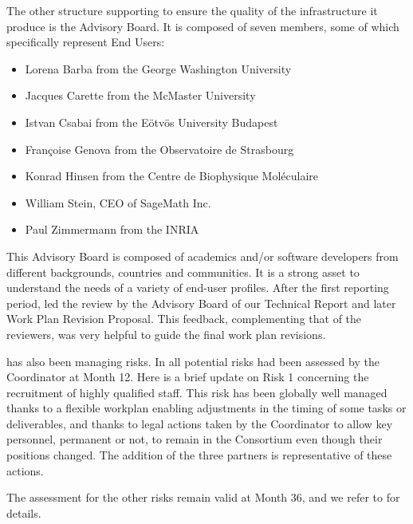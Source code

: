 

The other structure supporting \ODK to ensure the quality of the
infrastructure it produce is the Advisory Board. It is composed of
seven members, some of which specifically represent End Users:

\begin{itemize}
\item{Lorena Barba from the George Washington University}
\item{Jacques Carette from the McMaster University}
\item{Istvan Csabai from the Eötvös University Budapest}
\item{Françoise Genova from the Observatoire de Strasbourg}
\item{Konrad Hinsen from the Centre de Biophysique Moléculaire}
\item{William Stein, CEO of SageMath Inc.}
\item{Paul Zimmermann from the INRIA}
\end{itemize}

This Advisory Board is composed of academics and/or software
developers from different backgrounds, countries and communities. It
is a strong asset to understand the needs of a variety of end-user
profiles. After the first reporting period,  led the review
by the Advisory Board of our Technical Report and later Work Plan
Revision Proposal. This feedback, complementing that of the reviewers,
was very helpful to guide the final work plan revisions.

 has also been managing risks. In 
all potential risks had been assessed by the Coordinator at Month 12.
Here is a brief update on Risk 1 concerning the recruitment of highly
qualified staff. This risk has been globally well managed thanks to a
flexible workplan enabling adjustments in the timing of some tasks or
deliverables, and thanks to legal actions taken by the Coordinator to
allow key personnel, permanent or not, to remain in the Consortium
even though their positions changed. The addition of the three
partners is representative of these actions.

The assessment for the
other risks remain valid at Month 36, and we refer to
 for details.

\subparagraph{}

